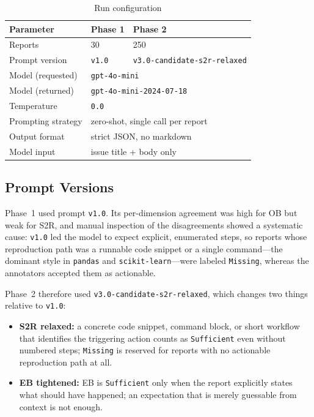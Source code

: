 \begin{table}[t]
\caption{Run configuration}
\label{tab:config}
\centering
\begin{tabular}{lll}
\hline
\textbf{Parameter} & \textbf{Phase 1} & \textbf{Phase 2} \\
\hline
Reports              & 30 & 250 \\
Prompt version       & \texttt{v1.0} & \texttt{v3.0-candidate-s2r-relaxed} \\
Model (requested)    & \multicolumn{2}{l}{\texttt{gpt-4o-mini}} \\
Model (returned)     & \multicolumn{2}{l}{\texttt{gpt-4o-mini-2024-07-18}} \\
Temperature          & \multicolumn{2}{l}{\texttt{0.0}} \\
Prompting strategy   & \multicolumn{2}{l}{zero-shot, single call per report} \\
Output format        & \multicolumn{2}{l}{strict JSON, no markdown} \\
Model input          & \multicolumn{2}{l}{issue title + body only} \\
\hline
\end{tabular}
\end{table}

\subsection{Prompt Versions}
\label{sec:method:prompts}

Phase~1 used prompt \texttt{v1.0}. Its per-dimension agreement was high
for OB but weak for S2R, and manual inspection of the disagreements
showed a systematic cause: \texttt{v1.0} led the model to expect
explicit, enumerated steps, so reports whose reproduction path was a
runnable code snippet or a single command---the dominant style in
\texttt{pandas} and \texttt{scikit-learn}---were labeled
\texttt{Missing}, whereas the annotators accepted them as actionable.

Phase~2 therefore used \texttt{v3.0-candidate-s2r-relaxed}, which
changes two things relative to \texttt{v1.0}:

\begin{itemize}
  \item \textbf{S2R relaxed:} a concrete code snippet, command block, or
        short workflow that identifies the triggering action counts as
        \texttt{Sufficient} even without numbered steps; \texttt{Missing}
        is reserved for reports with no actionable reproduction path at all.
  \item \textbf{EB tightened:} EB is \texttt{Sufficient} only when the
        report explicitly states what should have happened; an
        expectation that is merely guessable from context is not enough.
\end{itemize}

